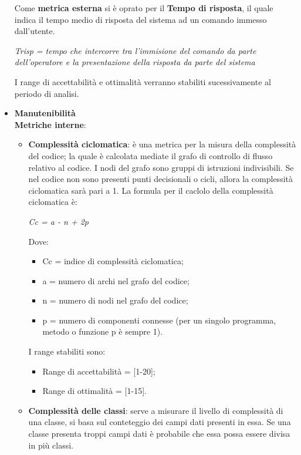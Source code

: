 \begin{itemize}
      Come \textbf{metrica esterna} si è oprato per il \textbf{Tempo di risposta},
      il quale indica il tempo medio di risposta del sistema ad un comando immesso dall'utente.
      \begin{center}
        \emph{Trisp = tempo che intercorre tra l'immisione del comando da parte dell'operatore e la presentazione della risposta da parte del sistema}
      \end{center}
      I range di accettabilità e ottimalità verranno stabiliti sucessivamente al periodo di analisi.
      \item \textbf{Manutenibilità}\\
        \textbf{Metriche interne}:
        \begin{itemize}
          \item \textbf{Complessità ciclomatica}: è una metrica per la misura della complessità del codice; la quale è calcolata mediate il grafo di controllo di flusso relativo al codice.
            I nodi del grafo sono gruppi di istruzioni indivisibili. Se nel codice non sono presenti punti decisionali o cicli, allora la complessità ciclomatica sarà pari a 1. La formula per il caclolo della complessità ciclomatica è:
            \begin{center}
              \emph{Cc = a - n + 2p}
            \end{center}
            Dove:
            \begin{itemize}
              \item Cc = indice di complessità ciclomatica;
              \item a = numero di archi nel grafo del codice;
              \item n = numero di nodi nel grafo del codice;
              \item p = numero di componenti connesse (per un singolo programma, metodo o funzione p è sempre 1).
            \end{itemize}
            I range stabiliti sono:
            \begin{itemize}
              \item Range di accettabilità = [1-20];
              \item Range di ottimalità = [1-15].
            \end{itemize}
          \item \textbf{Complessità delle classi}: serve a misurare il livello di complessità di una classe, si basa sul conteteggio dei campi dati presenti in essa.
          Se una classe presenta troppi campi dati è probabile che essa possa essere divisa in più classi.

\end{itemize}
\end{itemize}
